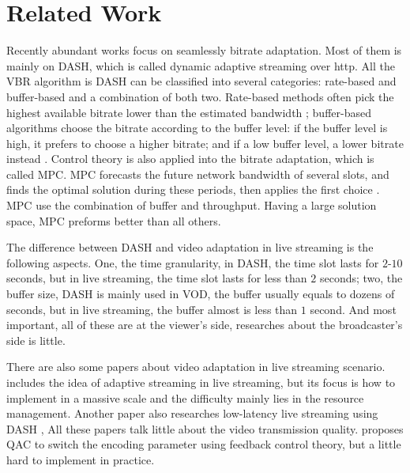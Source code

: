 \section{Related Work}
Recently abundant works focus on seamlessly bitrate adaptation. Most of them is mainly on DASH, which is called dynamic adaptive streaming over http. All the VBR algorithm is DASH can be classified into several categories: rate-based and buffer-based and a combination of both two. Rate-based methods often pick the highest available bitrate lower than the estimated bandwidth \cite{jiang2014improving}; buffer-based algorithms choose the bitrate according to the buffer level: if the buffer level is high, it prefers to choose a higher bitrate; and if a low buffer level, a lower bitrate instead \cite{huang2003adaptive}. Control theory is also applied into the bitrate adaptation, which is called MPC. MPC forecasts the future network bandwidth of several slots, and finds the optimal solution during these periods, then applies the first choice \cite{yin2015control}. MPC use the combination of buffer and throughput. Having a large solution space, MPC preforms better than all others. 

The difference between DASH and video adaptation in live streaming is the following aspects. One, the time granularity, in DASH, the time slot lasts for $2$-$10$ seconds, but in live streaming, the time slot lasts for less than $2$ seconds; two, the buffer size, DASH is mainly used in VOD, the buffer usually equals to dozens of seconds, but in live streaming, the buffer almost is less than $1$ second. And most important, all of these are at the viewer's side, researches about the broadcaster's side is little.

There are also some papers about video adaptation in live streaming scenario. \cite{pires2014dash} includes the idea of adaptive streaming in live streaming, but its focus is how to implement in a massive scale and the difficulty mainly lies in the resource management. Another paper also researches low-latency live streaming using DASH \cite{bouzakaria2014overhead}, All these papers talk little about the video transmission quality. \cite{de2011feedback} proposes QAC to switch the encoding parameter using feedback control theory, but a little hard to implement in practice.

